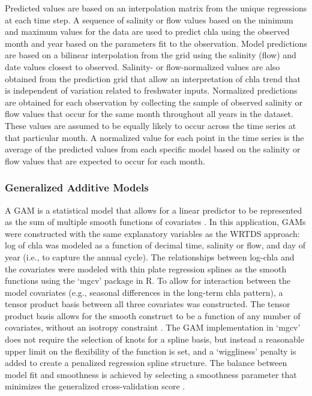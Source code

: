 \documentclass{svjour3}\usepackage[]{graphicx}\usepackage[]{color}
\begin{document}
Predicted values are based on an interpolation matrix from the unique regressions at each time step. A sequence of salinity or flow values based on the minimum and maximum values for the data are used to predict \ac{chla} using the observed month and year based on the parameters fit to the observation. Model predictions are based on a bilinear interpolation from the grid using the salinity (flow) and date values closest to observed. Salinity- or flow-normalized values are also obtained from the prediction grid that allow an interpretation of \ac{chla} trend that is independent of variation related to freshwater inputs. Normalized predictions are obtained for each observation by collecting the sample of observed salinity or flow values that occur for the same month throughout all years in the dataset.  These values are assumed to be equally likely to occur across the time series at that particular month. A normalized value for each point in the time series is the average of the predicted values from each specific model based on the salinity or flow values that are expected to occur for each month.

\subsubsection{Generalized Additive Models}

A \ac{GAM} is a statistical model that allows for a linear predictor to be represented as the sum of multiple smooth functions of covariates \cite{Hastie90}. In this application, \acp{GAM} were constructed with the same explanatory variables as the \ac{WRTDS} approach: log of \ac{chla} was modeled as a function of decimal time, salinity or flow, and day of year (i.e., to capture the annual cycle). The relationships between log-\ac{chla} and the covariates were modeled with thin plate regression splines \cite{Wood06} as the smooth functions using the `mgcv' package in R. To allow for interaction between the model covariates (e.g., seasonal differences in the long-term \ac{chla} pattern), a tensor product basis between all three covariates was constructed. The tensor product basis allows for the smooth construct to be a function of any number of covariates, without an isotropy constraint \cite{Wood06b}. The \ac{GAM} implementation in `mgcv' does not require the selection of knots for a spline basis, but instead a reasonable upper limit on the flexibility of the function is set, and a `wiggliness' penalty is added to create a penalized regression spline structure. The balance between model fit and smoothness is achieved by selecting a smoothness parameter that minimizes the generalized cross-validation score \cite{Wood06}.
\end{document}

